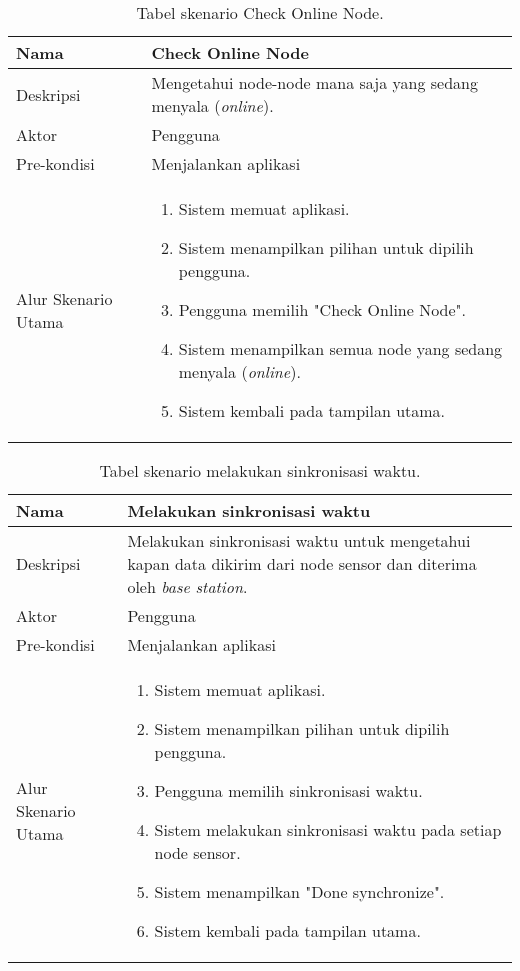 \begin{table}[H]
    \centering
    \caption{Tabel skenario Check Online Node.}
    \begin{tabular}{|p{3cm}|p{10cm}|}
    \hline
        Nama & Check Online Node\\
    \hline
    \hline
        Deskripsi & Mengetahui node-node mana saja yang sedang menyala (\textit{online}). \\
    \hline
        Aktor & Pengguna \\
    \hline
        Pre-kondisi & Menjalankan aplikasi \\
    \hline
        Alur Skenario Utama & 
        \begin{enumerate}
            \item Sistem memuat aplikasi.
            \item Sistem menampilkan pilihan untuk dipilih pengguna.
            \item Pengguna memilih "Check Online Node".
            \item Sistem menampilkan semua node yang sedang menyala (\textit{online}).
            \item Sistem kembali pada tampilan utama.
        \end{enumerate}\\
    \hline
    \end{tabular}
    \label{tab:skenario1}
\end{table}

\begin{table}[H]
    \centering
    \caption{Tabel skenario melakukan sinkronisasi waktu.}
    \begin{tabular}{|p{3cm}|p{10cm}|}
    \hline
        Nama & Melakukan sinkronisasi waktu\\
    \hline
    \hline
        Deskripsi & Melakukan sinkronisasi waktu untuk mengetahui kapan data dikirim dari node sensor dan diterima oleh \textit{base station}. \\
    \hline
        Aktor & Pengguna \\
    \hline
        Pre-kondisi & Menjalankan aplikasi \\
    \hline
        Alur Skenario Utama & 
        \begin{enumerate}
            \item Sistem memuat aplikasi.
            \item Sistem menampilkan pilihan untuk dipilih pengguna.
            \item Pengguna memilih sinkronisasi waktu.
            \item Sistem melakukan sinkronisasi waktu pada setiap node sensor.
            \item Sistem menampilkan "Done synchronize".
            \item Sistem kembali pada tampilan utama.
        \end{enumerate}\\
    \hline
    \end{tabular}
    \label{tab:skenario2}
\end{table}

